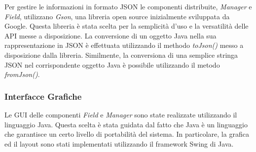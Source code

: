 Per gestire le informazioni in formato JSON le componenti distribuite, \emph{Manager} e \emph{Field}, utilizzano \emph{Gson}, una libreria open source  inizialmente sviluppata da Google. Questa libreria \`{e} stata scelta per la semplicit\`{a} d'uso e la versatilit\`{a} delle API messe a disposizione. La conversione di un oggetto Java nella sua rappresentazione in JSON \`{e} effettuata utilizzando il methodo \emph{toJson()} messo a disposizione dalla libreria. Similmente, la conversiona di una semplice stringa JSON nel corrispondente oggetto Java \`{e} possibile utilizzando il metodo \emph{fromJson()}. 

\subsubsection{Interfacce Grafiche}
Le GUI delle componenti \emph{Field} e \emph{Manager} sono state realizzate utilizzando il linguaggio Java. Questa scelta \`{e} stata guidata dal fatto che Java \`{e} un linguaggio che garantisce un certo livello di portabilit\`{a} del sistema. In particolare, la grafica ed il layout sono stati implementati utilizzando il framework Swing di Java.